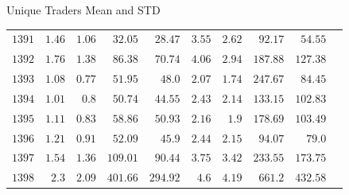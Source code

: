 \documentclass{beamer}
\begin{document}
\begin{frame}{Unique Traders Mean and STD}
\begin{tabular}{lrrrrrrrrr}
        \(\mathrm{1391}\)           & \(\mathrm{1.46}\)                              & \(\mathrm{1.06}\)                           & \(\mathrm{32.05}\)                             & \(\mathrm{28.47}\)                          & \(\mathrm{3.55}\) & \(\mathrm{2.62}\) & \(\mathrm{92.17}\)   & \(\mathrm{54.55}\)   \\
        \(\mathrm{1392}\)           & \(\mathrm{1.76}\)                              & \(\mathrm{1.38}\)                           & \(\mathrm{86.38}\)                             & \(\mathrm{70.74}\)                          & \(\mathrm{4.06}\) & \(\mathrm{2.94}\) & \(\mathrm{187.88}\)  & \(\mathrm{127.38}\)  \\
        \(\mathrm{1393}\)           & \(\mathrm{1.08}\)                              & \(\mathrm{0.77}\)                           & \(\mathrm{51.95}\)                             & \(\mathrm{48.0}\)                           & \(\mathrm{2.07}\) & \(\mathrm{1.74}\) & \(\mathrm{247.67}\)  & \(\mathrm{84.45}\)   \\
        \(\mathrm{1394}\)           & \(\mathrm{1.01}\)                              & \(\mathrm{0.8}\)                            & \(\mathrm{50.74}\)                             & \(\mathrm{44.55}\)                          & \(\mathrm{2.43}\) & \(\mathrm{2.14}\) & \(\mathrm{133.15}\)  & \(\mathrm{102.83}\)  \\
        \(\mathrm{1395}\)           & \(\mathrm{1.11}\)                              & \(\mathrm{0.83}\)                           & \(\mathrm{58.86}\)                             & \(\mathrm{50.93}\)                          & \(\mathrm{2.16}\) & \(\mathrm{1.9}\)  & \(\mathrm{178.69}\)  & \(\mathrm{103.49}\)  \\
        \(\mathrm{1396}\)           & \(\mathrm{1.21}\)                              & \(\mathrm{0.91}\)                           & \(\mathrm{52.09}\)                             & \(\mathrm{45.9}\)                           & \(\mathrm{2.44}\) & \(\mathrm{2.15}\) & \(\mathrm{94.07}\)   & \(\mathrm{79.0}\)    \\
        \(\mathrm{1397}\)           & \(\mathrm{1.54}\)                              & \(\mathrm{1.36}\)                           & \(\mathrm{109.01}\)                            & \(\mathrm{90.44}\)                          & \(\mathrm{3.75}\) & \(\mathrm{3.42}\) & \(\mathrm{233.55}\)  & \(\mathrm{173.75}\)  \\
        \(\mathrm{1398}\)           & \(\mathrm{2.3}\)                               & \(\mathrm{2.09}\)                           & \(\mathrm{401.66}\)                            & \(\mathrm{294.92}\)                         & \(\mathrm{4.6}\)  & \(\mathrm{4.19}\) & \(\mathrm{661.2}\)   & \(\mathrm{432.58}\)  \\

\end{tabular}
\end{frame}
\end{document}
